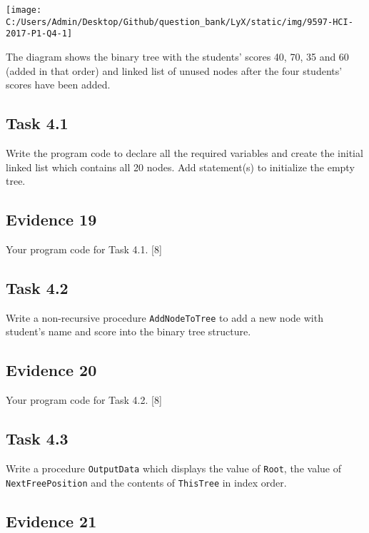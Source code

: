 \begin{center}
\texttt{[image: C:/Users/Admin/Desktop/Github/question\_bank/LyX/static/img/9597-HCI-2017-P1-Q4-1]}
\par\end{center}

The diagram shows the binary tree with the students\textquoteright{}
scores 40, 70, 35 and 60 (added in that order) and linked list of
unused nodes after the four students\textquoteright{} scores have
been added. 

\subsection*{Task 4.1 }

Write the program code to declare all the required variables and create
the initial linked list which contains all 20 nodes. Add statement(s)
to initialize the empty tree. 

\subsection*{Evidence 19 }

Your program code for Task 4.1. \hfill{}{[}8{]}

\subsection*{Task 4.2}

Write a non-recursive procedure \texttt{AddNodeToTree} to add a new
node with student\textquoteright s name and score into the binary
tree structure. 

\subsection*{Evidence 20}

Your program code for Task 4.2.\hfill{} {[}8{]}

\subsection*{Task 4.3 }

Write a procedure \texttt{OutputData} which displays the value of
\texttt{Root}, the value of \texttt{NextFreePosition} and the contents
of \texttt{ThisTree} in index order.

\subsection*{Evidence 21 }

